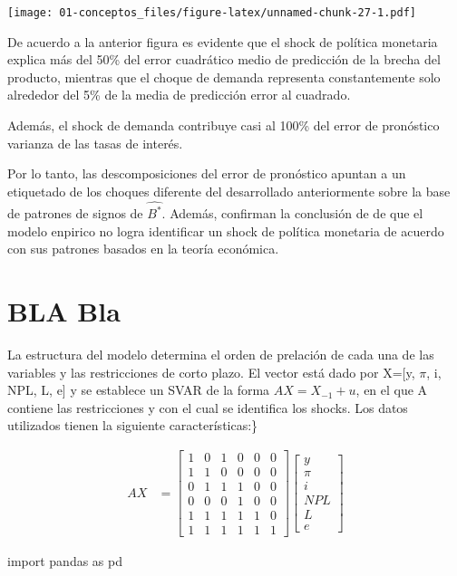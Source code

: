 \documentclass[
]{book}
\newenvironment{Shaded}{\begin{snugshade}}{\end{snugshade}}
\newcommand{\ImportTok}[1]{#1}
\newcommand{\NormalTok}[1]{#1}
\begin{document}
\texttt{[image: 01-conceptos\_files/figure-latex/unnamed-chunk-27-1.pdf]}

De acuerdo a la anterior figura es evidente que el shock de política monetaria explica más del 50\% del error cuadrático medio de predicción de la brecha del producto, mientras que el choque de demanda representa constantemente solo alrededor del 5\% de la media de predicción
error al cuadrado.

Además, el shock de demanda contribuye casi al 100\% del error de pronóstico
varianza de las tasas de interés.

Por lo tanto, las descomposiciones del error de pronóstico apuntan a un
etiquetado de los choques diferente del desarrollado anteriormente sobre la base de patrones de signos de \(\hat{B^{*}}\). Además, confirman la conclusión de \citet{Herwartz2016} de que el modelo enpirico no logra identificar un shock de política monetaria de acuerdo con sus patrones basados en la teoría económica.

\hypertarget{bla-bla}{%
\section{BLA Bla}\label{bla-bla}}

La estructura del modelo determina el orden de prelación de cada una de las variables y las restricciones de corto plazo.
El vector está dado por X={[}y, \(\pi\), i, NPL, L, e{]} y se establece un SVAR de la forma \(AX=X_{-1}+u\), en el que A contiene las restricciones y con el cual se identifica los shocks.
Los datos utilizados tienen la siguiente características:\}

\begin{eqnarray}
AX&=\begin{bmatrix}
1 & 0 & 1 & 0 & 0 & 0  \\
1 & 1 & 0 & 0 & 0 & 0 \\
0 & 1 & 1 & 1 & 0 & 0 \\
0 & 0 & 0 & 1 & 0 & 0 \\
1 & 1 & 1 & 1 & 1 & 0 \\
1 & 1 & 1 & 1 & 1 & 1 \end{bmatrix}
\begin{bmatrix}
y \\
\pi \\
i\\
NPL\\
L\\
e\end{bmatrix}
\end{eqnarray}

\begin{Shaded}
\begin{Highlighting}[]
\ImportTok{import}\NormalTok{ pandas }\ImportTok{as}\NormalTok{ pd}
\end{Highlighting}
\end{Shaded}


  
\end{document}
